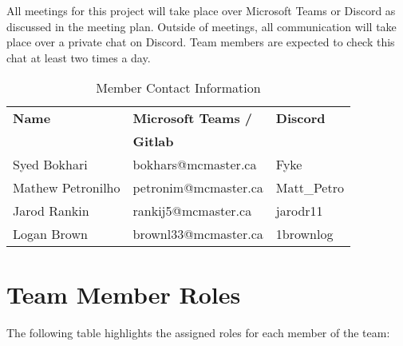 \documentclass{article}
\begin{document}
All meetings for this project will take place over Microsoft Teams or Discord as discussed in the meeting plan. Outside of meetings, all communication will take place over a private chat on Discord. Team members are expected to check this chat at least two times a day.

\begin{table}[h]
\label{tab:my-table}
\begin{tabularx}{\textwidth}{|X|X|X|}
\hline
\textbf{Name}    & \textbf{Microsoft Teams /} & \textbf{Discord}     \\
& \textbf{Gitlab} &\\ \hline
Syed Bokhari       & bokhars@mcmaster.ca      & Fyke        \\
Mathew Petronilho & petronim@mcmaster.ca     & Matt\_Petro \\
Jarod Rankin       & rankij5@mcmaster.ca      & jarodr11    \\
Logan Brown        & brownl33@mcmaster.ca     & 1brownlog   \\ \hline
\end{tabularx}
\caption{Member Contact Information}
\end{table}

\newpage

\section{Team Member Roles}
The following table highlights the assigned roles for each member of the team:
\end{document}
